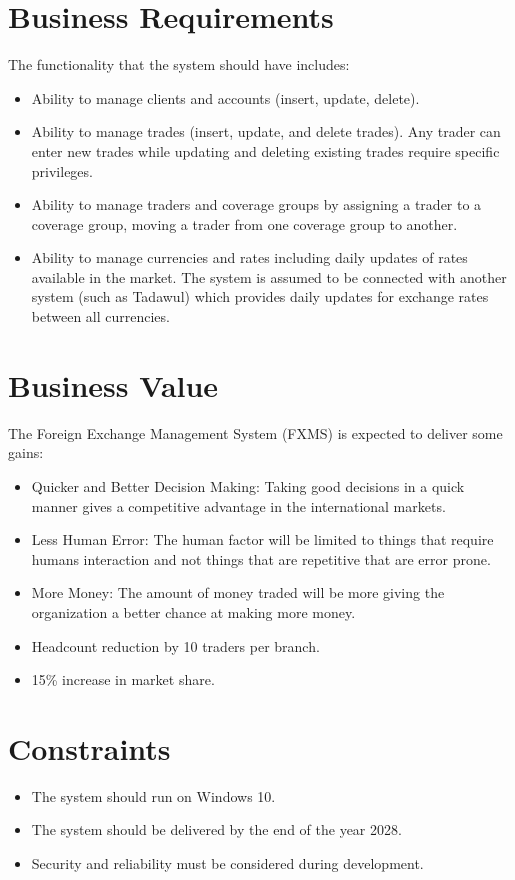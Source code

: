 \documentclass[a4paper]{report}
\begin{document}
\section{Business Requirements}
The functionality that the system should have includes:
\begin{itemize}
    \item Ability to manage clients and accounts (insert, update, delete).
    \item Ability to manage trades (insert, update, and delete trades). Any trader can enter new trades while updating and deleting existing trades require specific privileges.
    \item Ability to manage traders and coverage groups by assigning a trader to a coverage group, moving a trader from one coverage group to another.
    \item Ability to manage currencies and rates including daily updates of rates available in the market. The system is assumed to be connected with another system (such as Tadawul) which provides daily updates for exchange rates between all currencies.
\end{itemize}

\section{Business Value}
The Foreign Exchange Management System (FXMS) is expected to deliver some gains:
\begin{itemize}
    \item Quicker and Better Decision Making: Taking good decisions in a quick manner gives a competitive advantage in the international markets.
    \item Less Human Error: The human factor will be limited to things that require humans interaction and not things that are repetitive that are error prone.
    \item More Money: The amount of money traded will be more giving the organization a better chance at making more money.
    \item Headcount reduction by 10 traders per branch.
    \item 15\% increase in market share.
\end{itemize}

\section{Constraints}
\begin{itemize}
    \item The system should run on Windows 10.
    \item The system should be delivered by the end of the year 2028.
    \item Security and reliability must be considered during development.
\end{itemize}
\end{document}
